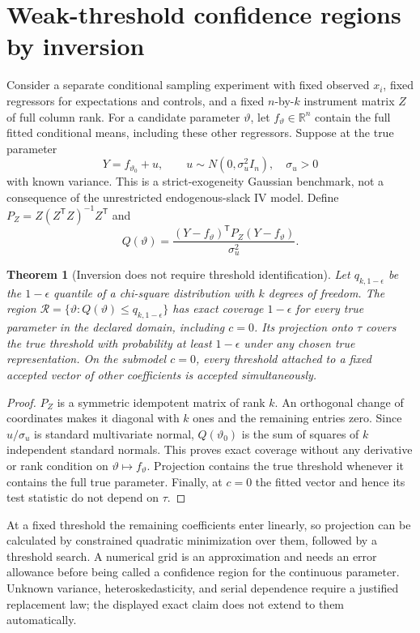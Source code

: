 \documentclass[11pt]{article}
\newtheorem{theorem}{Theorem}
\theoremstyle{definition}
\begin{document}
\section*{Weak-threshold confidence regions by inversion}
Consider a separate conditional sampling experiment with fixed observed $x_i$, fixed regressors for expectations and controls, and a fixed $n$-by-$k$ instrument matrix $Z$ of full column rank. For a candidate parameter $\vartheta$, let $f_\vartheta\in\mathbb R^n$ contain the full fitted conditional means, including these other regressors. Suppose at the true parameter
\[
 Y=f_{\vartheta_0}+u,\qquad u\sim N(0,\sigma_u^2I_n),\quad\sigma_u>0
\]
with known variance. This is a strict-exogeneity Gaussian benchmark, not a consequence of the unrestricted endogenous-slack IV model. Define $P_Z=Z(Z^{\mathsf T}Z)^{-1}Z^{\mathsf T}$ and
\[
 Q(\vartheta)=\frac{(Y-f_\vartheta)^{\mathsf T}P_Z(Y-f_\vartheta)}{\sigma_u^2}.
\]
\begin{theorem}[Inversion does not require threshold identification]
Let $q_{k,1-\epsilon}$ be the $1-\epsilon$ quantile of a chi-square distribution with $k$ degrees of freedom. The region
$\mathcal R=\{\vartheta:Q(\vartheta)\le q_{k,1-\epsilon}\}$ has exact coverage $1-\epsilon$ for every true parameter in the declared domain, including $c=0$. Its projection onto $\tau$ covers the true threshold with probability at least $1-\epsilon$ under any chosen true representation. On the submodel $c=0$, every threshold attached to a fixed accepted vector of other coefficients is accepted simultaneously.
\end{theorem}
\begin{proof}
$P_Z$ is a symmetric idempotent matrix of rank $k$. An orthogonal change of coordinates makes it diagonal with $k$ ones and the remaining entries zero. Since $u/\sigma_u$ is standard multivariate normal, $Q(\vartheta_0)$ is the sum of squares of $k$ independent standard normals. This proves exact coverage without any derivative or rank condition on $\vartheta\mapsto f_\vartheta$. Projection contains the true threshold whenever it contains the full true parameter. Finally, at $c=0$ the fitted vector and hence its test statistic do not depend on $\tau$.
\end{proof}
At a fixed threshold the remaining coefficients enter linearly, so projection can be calculated by constrained quadratic minimization over them, followed by a threshold search. A numerical grid is an approximation and needs an error allowance before being called a confidence region for the continuous parameter. Unknown variance, heteroskedasticity, and serial dependence require a justified replacement law; the displayed exact claim does not extend to them automatically.
\end{document}
